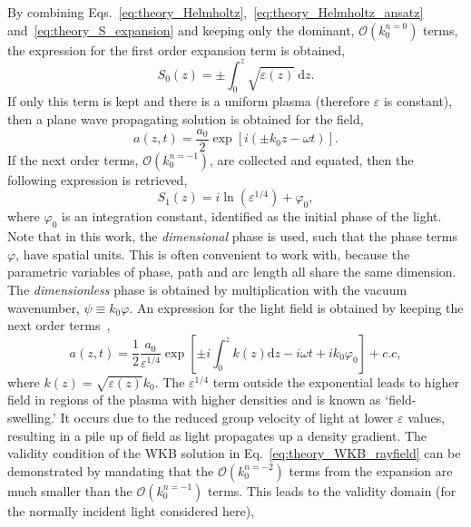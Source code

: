 By combining Eqs.~\ref{eq:theory_Helmholtz},~\ref{eq:theory_Helmholtz_ansatz} and~\ref{eq:theory_S_expansion} and keeping only the dominant, $\mathcal{O}\left(k_0^{n=0}\right)$ terms, the expression for the first order expansion term is obtained,
\begin{equation}
    S_0(z) = \pm \int_0^z \sqrt{\varepsilon(z)}\ \text{d}z.
\end{equation}
If only this term is kept and there is a uniform plasma (therefore $\varepsilon$ is constant), then a plane wave propagating solution is obtained for the field,
\begin{equation}
    a(z,t) = \frac{a_0}{2} \exp{\left[  i (\pm k_0 z - \omega t )\right]}.
\end{equation}
If the next order terms, $\mathcal{O}\left(k_0^{n=-1}\right)$, are collected and equated, then the following expression is retrieved,
\begin{equation}
    S_1(z) = i \ln{\left( \varepsilon^{1/4} \right)} + \varphi_0,
\end{equation}
where $\varphi_0$ is an integration constant, identified as the initial phase of the light.
Note that in this work, the \textit{dimensional} phase is used, such that the phase terms $\varphi$, have spatial units.
This is often convenient to work with, because the parametric variables of phase, path and arc length all share the same dimension.
The \textit{dimensionless} phase is obtained by multiplication with the vacuum wavenumber, $\psi \equiv k_0 \varphi$.
An expression for the light field is obtained by keeping the next order terms~\cite{michel_introduction_2023},
\begin{equation}
    \label{eq:theory_WKB_rayfield}
    a(z,t) = \frac{1}{2}\frac{a_0}{\varepsilon^{1/4}}\exp{ \left[ \pm i \int_0^z k(z) \text{d}z - i\omega t +ik_0\varphi_0 \right] } + c.c,
\end{equation}
where $k(z)=\sqrt{\varepsilon(z)}k_0$.
The $\varepsilon^{1/4}$ term outside the exponential leads to higher field in regions of the plasma with higher densities and is known as `field-swelling.'
It occurs due to the reduced group velocity of light at lower $\varepsilon$ values, resulting in a pile up of field as light propagates up a density gradient.
The validity condition of the WKB solution in Eq.~\ref{eq:theory_WKB_rayfield} can be demonstrated by mandating that the $\mathcal{O}\left(k_0^{n=-2}\right)$ terms from the expansion are much smaller than the $\mathcal{O}\left(k_0^{n=-1}\right)$ terms.
This leads to the validity domain (for the normally incident light considered here),
